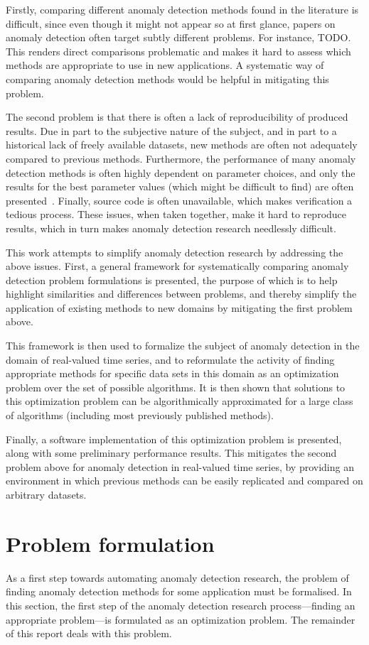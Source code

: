 Firstly, comparing different anomaly detection methods found in the literature is difficult, since even though it might not appear so at first glance, papers on anomaly detection often target subtly different problems. For instance, TODO. This renders direct comparisons problematic and makes it hard to assess which methods are appropriate to use in new applications. A systematic way of comparing anomaly detection methods would be helpful in mitigating this problem.

The second problem is that there is often a lack of reproducibility of produced results. Due in part to the subjective nature of the subject, and in part to a historical lack of freely available datasets, new methods are often not adequately compared to previous methods. Furthermore, the performance of many anomaly detection methods is often highly dependent on parameter choices, and only the results for the best parameter values (which might be difficult to find) are often presented~\cite{keogh5}. Finally, source code is often unavailable, which makes verification a tedious process. These issues, when taken together, make it hard to reproduce results, which in turn makes anomaly detection research needlessly difficult.

This work attempts to simplify anomaly detection research by addressing the above issues. First, a general framework for systematically comparing anomaly detection problem formulations is presented, the purpose of which is to help highlight similarities and differences between problems, and thereby simplify the application of existing methods to new domains by mitigating the first problem above.

This framework is then used to formalize the subject of anomaly detection in the domain of real-valued time series, and to reformulate the activity of finding appropriate methods for specific data sets in this domain as an optimization problem over the set of possible algorithms. It is then shown that solutions to this optimization problem can be algorithmically approximated for a large class of algorithms (including most previously published methods).

Finally, a software implementation of this optimization problem is presented, along with some preliminary performance results. This mitigates the second problem above for anomaly detection in real-valued time series, by providing an environment in which previous methods can be easily replicated and compared on arbitrary datasets.

\section{Problem formulation}
As a first step towards automating anomaly detection research, the problem of finding anomaly detection methods for some application must be formalised. In this section, the first step of the anomaly detection research process---finding an appropriate problem---is formulated as an optimization problem. The remainder of this report deals with this problem.

